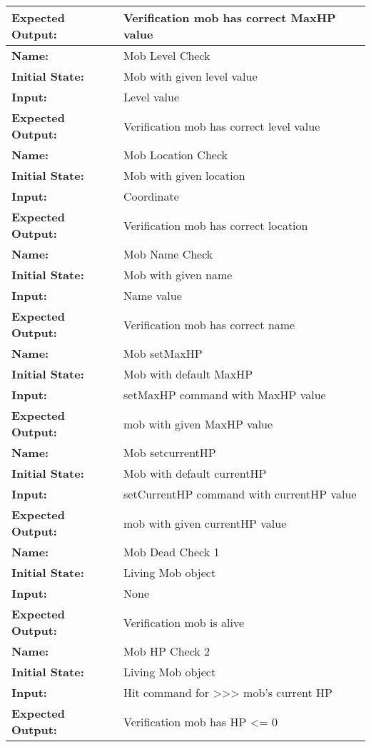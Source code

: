 \documentclass[12pt, titlepage]{article}
\begin{document}
\begin{center}
\begin{longtable}{ l | l }
\textbf{Expected Output:} & Verification mob has correct MaxHP value\\
\hline
\textbf{Name:} & Mob Level Check\\
\textbf{Initial State:} & Mob with given level value\\
\textbf{Input:} & Level value\\
\textbf{Expected Output:} & Verification mob has correct level value\\
\hline
\textbf{Name:} & Mob Location Check\\
\textbf{Initial State:} & Mob with given location\\
\textbf{Input:} & Coordinate\\
\textbf{Expected Output:} & Verification mob has correct location\\
\hline
\textbf{Name:} & Mob Name Check\\
\textbf{Initial State:} & Mob with given name\\
\textbf{Input:} & Name value\\
\textbf{Expected Output:} & Verification mob has correct name\\
\hline
\textbf{Name:} & Mob setMaxHP\\
\textbf{Initial State:} & Mob with default MaxHP\\
\textbf{Input:} & setMaxHP command with MaxHP value\\
\textbf{Expected Output:} & mob with given MaxHP value\\
\hline
\textbf{Name:} & Mob setcurrentHP\\
\textbf{Initial State:} & Mob with default currentHP\\
\textbf{Input:} & setCurrentHP command with currentHP value\\
\textbf{Expected Output:} & mob with given currentHP value\\
\hline
\textbf{Name:} & Mob Dead Check 1\\
\textbf{Initial State:} & Living Mob object\\
\textbf{Input:} & None\\
\textbf{Expected Output:} & Verification mob is alive\\
\hline
\textbf{Name:} & Mob HP Check 2\\
\textbf{Initial State:} & Living Mob object\\
\textbf{Input:} & Hit command for >>> mob's current HP\\
\textbf{Expected Output:} & Verification mob has HP <= 0\\

\end{longtable}
\end{center}
\end{document}

